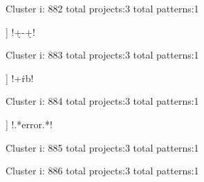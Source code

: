 Cluster i: 882
total projects:3
total patterns:1
\begin{multicols}{1}
\begin{description}[noitemsep,topsep=0pt]
\item [[3] ] \cverb!\d+-\d+!
\end{description}
\end{multicols}







Cluster i: 883
total projects:3
total patterns:1
\begin{multicols}{1}
\begin{description}[noitemsep,topsep=0pt]
\item [[3] ] \cverb!\w+\.rb!
\end{description}
\end{multicols}







Cluster i: 884
total projects:3
total patterns:1
\begin{multicols}{1}
\begin{description}[noitemsep,topsep=0pt]
\item [[3] ] \cverb!.*error.*!
\end{description}
\end{multicols}







Cluster i: 885
total projects:3
total patterns:1
\begin{multicols}{1}
\begin{description}[noitemsep,topsep=0pt]
\item [[3] ] \cverb![\n\t\r}]!
\end{description}
\end{multicols}







Cluster i: 886
total projects:3
total patterns:1
\begin{multicols}{1}
\end{multicols}







